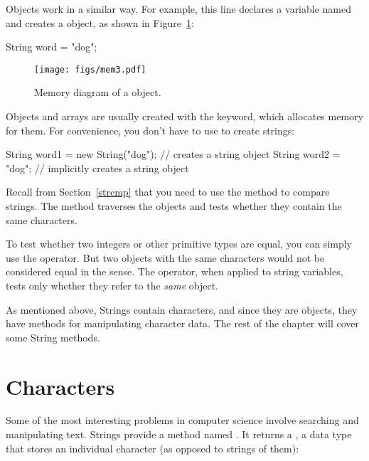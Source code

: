 

Objects work in a similar way.
For example, this line declares a  variable named  and creates a  object, as shown in Figure~\ref{fig.mem3}:

\begin{code}
String word = "dog";
\end{code}

\begin{figure}[!ht]
\begin{center}
\texttt{[image: figs/mem3.pdf]}
\caption{Memory diagram of a  object.}
\label{fig.mem3}
\end{center}
\end{figure}

Objects and arrays are usually created with the  keyword, which allocates memory for them. %
For convenience, you don't have to use  to create strings:

\begin{code}
String word1 = new String("dog");  // creates a string object
String word2 = "dog";   // implicitly creates a string object
\end{code}


Recall from Section~\ref{strcmp} that you need to use the  method to compare strings.
The  method traverses the  objects and tests whether they contain the same characters.

To test whether two integers or other primitive types are equal, you can simply use the \java{==} operator.
But two  objects with the same characters would not be considered equal in the \java{==} sense.
The \java{==} operator, when applied to string variables, tests only whether they refer to the {\em same} object.

As mentioned above, Strings contain characters, and since they are objects, they have methods for manipulating
character data. The rest of the chapter will cover some String methods.

\section{Characters}
Some of the most interesting problems in computer science involve searching and manipulating text.
Strings provide a method named .
It returns a , a data type that stores an individual character (as opposed to strings of them):


